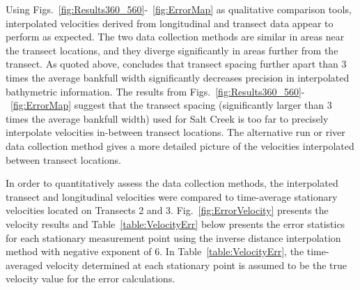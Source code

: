 \documentclass[Journal,letterpaper,BackFigs]{ascelike-new}
\begin{document}
Using Figs.~\ref{fig:Results360_560}-~\ref{fig:ErrorMap} as qualitative comparison tools, interpolated velocities derived from longitudinal and transect data appear to perform as expected. The two data collection methods are similar in areas near the transect locations, and they diverge significantly in areas further from the transect. As quoted above,  concludes that transect spacing further apart than 3 times the average bankfull width significantly decreases precision in interpolated bathymetric information. The results from Figs.~\ref{fig:Results360_560}-~\ref{fig:ErrorMap} suggest that the transect spacing (significantly larger than 3 times the average bankfull width) used for Salt Creek is too far to precisely interpolate velocities in-between transect locations. The alternative run or river data collection method gives a more detailed picture of the velocities interpolated between transect locations. 

In order to quantitatively assess the data collection methods, the interpolated transect and longitudinal velocities were compared to time-average stationary velocities located on Transects 2 and 3. Fig.~\ref{fig:ErrorVelocity} presents the velocity results and Table~\ref{table:VelocityErr} below presents the error statistics for each stationary measurement point using the inverse distance interpolation method with negative exponent of 6. In Table~\ref{table:VelocityErr}, the time-averaged velocity determined at each stationary point is assumed to be the true velocity value for the error calculations.
\end{document}
